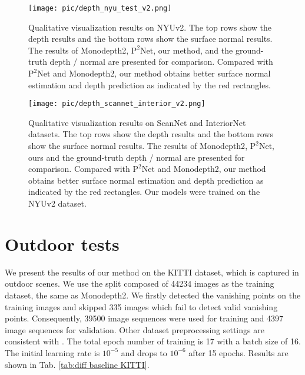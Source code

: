\documentclass[10pt,twocolumn,letterpaper]{article}
\begin{document}
\begin{figure*}[t!]
	\texttt{[image: pic/depth\_nyu\_test\_v2.png]}
	\caption{Qualitative visualization results on NYUv2.
 The top rows show the depth results and the bottom rows show the surface normal results.
		The results of Monodepth2\cite{godard2019digging}, $\mathrm{P}^{2}\mathrm{Net}$\cite{yu2020p}, our method, and the ground-truth depth / normal are presented for comparison.
		Compared with  $\mathrm{P}^{2}\mathrm{Net}$\cite{yu2020p} and Monodepth2\cite{godard2019digging}, our method obtains better surface normal estimation and depth prediction as indicated by the red rectangles.
} 
	\label{Fig:depth results visualization nyu}
\end{figure*}

\begin{figure*}[t!]
	\texttt{[image: pic/depth\_scannet\_interior\_v2.png]}
	\caption{Qualitative visualization results on ScanNet and InteriorNet datasets.
 The top rows show the depth results and the bottom rows show the surface normal results.
		The results of Monodepth2\cite{godard2019digging}, $\mathrm{P}^{2}\mathrm{Net}$\cite{yu2020p}, ours and the ground-truth depth / normal are presented for comparison.
		Compared with  $\mathrm{P}^{2}\mathrm{Net}$\cite{yu2020p} and Monodepth2\cite{godard2019digging}, our method obtains better surface normal estimation and depth prediction as indicated by the red rectangles. Our models were trained on the NYUv2 dataset.
	} 
	\label{Fig:depth results visualization ScanInter}
\end{figure*}


\section{Outdoor tests}

We present the results of our method on the KITTI dataset, which is captured in outdoor scenes.
We use the split composed of 44234 images as the training dataset, the same as Monodepth2\cite{godard2019digging}.
We firstly detected the vanishing points on the training images and skipped 335 images which fail to detect valid vanishing points.
Consequently, 39500 image sequences were used for training and 4397 image sequences for validation.
Other dataset preprocessing settings are consistent with \cite{godard2019digging}. 
The total epoch number of training is 17 with a batch size of 16. The initial learning rate is $10^{-5}$ and drops to $10^{-6}$ after 15 epochs. 
Results are shown in Tab. \ref{tab:diff baseline KITTI}. 
\end{document}
